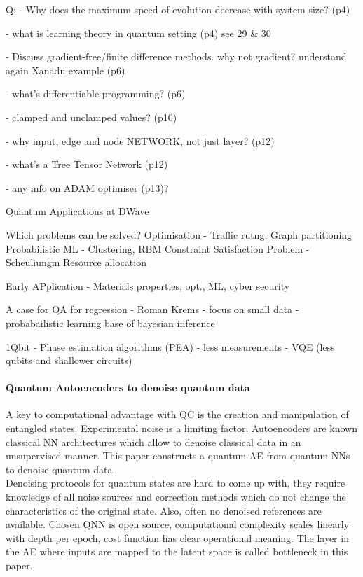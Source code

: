 Q:
- Why does the maximum speed of evolution decrease with system size? (p4)

- what is learning theory in quantum setting (p4)
see 29 \& 30

- Discuss gradient-free/finite difference methods. why not gradient? understand
  again Xanadu example (p6)

- what's differentiable programming? (p6)

- clamped and unclamped values? (p10)

- why input, edge and node NETWORK, not just layer? (p12)

- what's a Tree Tensor Network (p12)

- any info on ADAM optimiser (p13)?




Quantum Applications at DWave

Which problems can be solved?
Optimisation - Traffic rutng, Graph partitioning
Probabilistic ML - Clustering, RBM
Constraint Satisfaction Problem - Scheuliungm Resource allocation

Early APplication
- Materials properties, opt., ML, cyber security


A case for QA for regression
- Roman Krems
- focus on small data
- probabailistic learning base of bayesian inference


1Qbit
- Phase estimation algorithms (PEA) - less measurements
- VQE (less qubits and shallower circuits)

\paragraph{Quantum Autoencoders to denoise quantum data}
A key to computational advantage with QC is the creation and manipulation of 
entangled states. Experimental noise is a limiting factor. Autoencoders are known 
classical NN architectures which allow to denoise classical data in an unsupervised manner.
This paper constructs a quantum AE from quantum NNs to denoise quantum data.\\
Denoising protocols for quantum states are hard to come up with, they require
knowledge of all noise sources and correction methods which do not change the 
characteristics of the original state. Also, often no denoised references are available.
Chosen QNN is open source, computational complexity scales linearly with depth per epoch, 
cost function has clear operational meaning.  
The layer in the AE where inputs are mapped to the latent space is called bottleneck in this paper.

